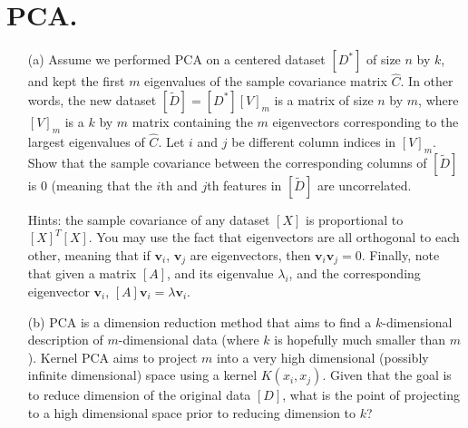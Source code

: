 \documentclass[11pt]{article}
\renewcommand{\vec}[1]{\mathbf{#1}}
\begin{document}
\pagebreak

\section*{PCA.}

\begin{enumerate}
\item[(a)] Assume we performed PCA on a centered dataset $[D^*]$ of size $n$ by $k$, and kept the first $m$ eigenvalues of the sample covariance matrix $\hat{C}$.
In other words, the new dataset $[\tilde{D}] = [D^*] [V]_m$ is a matrix of size $n$ by $m$, where $[V]_m$ is a $k$ by $m$ matrix containing the $m$ eigenvectors corresponding to the largest eigenvalues
of $\hat{C}$.  Let $i$ and $j$ be different column indices in $[V]_m$.  Show that the sample covariance between the corresponding columns of $[\tilde{D}]$ is $0$ (meaning that the $i$th and $j$th features in $[\tilde{D}]$ are uncorrelated.

Hints: the sample covariance of any dataset $[X]$ is proportional to $[X]^T [X]$.  You may use the fact that eigenvectors are all orthogonal to each other, meaning that if $\vec{v}_i$, $\vec{v}_j$ are eigenvectors, then $\vec{v}_i \vec{v}_j = 0$.  Finally, note that given a matrix $[A]$, and its eigenvalue $\lambda_i$, and the corresponding eigenvector $\vec{v}_i$, $[A] \vec{v}_i = \lambda \vec{v}_i$.

\item[(b)] PCA is a dimension reduction method that aims to find a $k$-dimensional description of $m$-dimensional data (where $k$ is hopefully much smaller than $m$).
Kernel PCA aims to project $m$ into a very high dimensional (possibly infinite dimensional) space using a kernel $K(x_i,x_j)$.  Given that the goal is to reduce dimension of the
original data $[D]$, what is the point of projecting to a high dimensional space prior to reducing dimension to $k$?

\end{enumerate}
\end{document}
